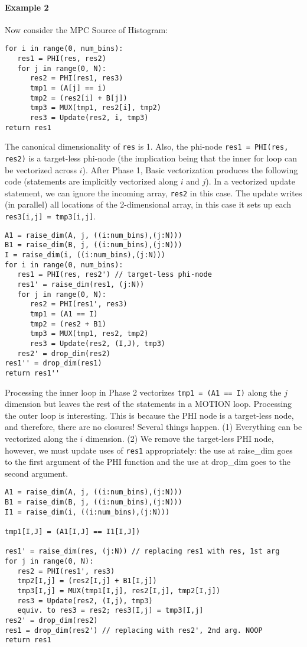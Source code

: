 \paragraph{Example 2} Now consider the MPC Source of Histogram:

{\small
\begin{verbatim}
for i in range(0, num_bins):
   res1 = PHI(res, res2)
   for j in range(0, N):
      res2 = PHI(res1, res3)
      tmp1 = (A[j] == i)
      tmp2 = (res2[i] + B[j])
      tmp3 = MUX(tmp1, res2[i], tmp2)
      res3 = Update(res2, i, tmp3)
return res1
\end{verbatim}
}

The canonical dimensionality of \texttt{res} is 1. Also, the phi-node \texttt{res1 = PHI(res, res2)} is a target-less phi-node (the implication being that the inner for loop can be vectorized across $i$). After Phase 1, Basic vectorization produces the following code (statements are implicitly vectorized along $i$ and $j$). In a vectorized update statement, we can ignore the incoming array, \texttt{res2} in this case. The update writes (in parallel) all locations of the 2-dimensional array, in this case it sets up each \texttt{res3[i,j] = tmp3[i,j]}.

{\small
\begin{verbatim}
A1 = raise_dim(A, j, ((i:num_bins),(j:N)))
B1 = raise_dim(B, j, ((i:num_bins),(j:N)))
I = raise_dim(i, ((i:num_bins),(j:N)))
for i in range(0, num_bins):
   res1 = PHI(res, res2') // target-less phi-node
   res1' = raise_dim(res1, (j:N))
   for j in range(0, N):
      res2 = PHI(res1', res3)
      tmp1 = (A1 == I)
      tmp2 = (res2 + B1)
      tmp3 = MUX(tmp1, res2, tmp2)
      res3 = Update(res2, (I,J), tmp3)
   res2' = drop_dim(res2)
res1'' = drop_dim(res1)
return res1''
\end{verbatim}
}

Processing the inner loop in Phase 2 vectorizes \texttt{tmp1 = (A1 == I)} along the $j$ dimension but leaves the rest of the statements in a MOTION loop. Processing the outer loop is interesting. This is because the PHI node is a target-less node, and therefore, there are no closures! Several things happen. (1) Everything can be vectorized along the $i$ dimension. (2) We remove the target-less PHI node, however, we must update uses of \texttt{res1} appropriately: the use at raise\_dim goes to the first argument of the PHI function and the use at drop\_dim goes to the second argument.

{\small
\begin{verbatim}
A1 = raise_dim(A, j, ((i:num_bins),(j:N)))
B1 = raise_dim(B, j, ((i:num_bins),(j:N)))
I1 = raise_dim(i, ((i:num_bins),(j:N)))

tmp1[I,J] = (A1[I,J] == I1[I,J])

res1' = raise_dim(res, (j:N)) // replacing res1 with res, 1st arg
for j in range(0, N):
   res2 = PHI(res1', res3)
   tmp2[I,j] = (res2[I,j] + B1[I,j])
   tmp3[I,j] = MUX(tmp1[I,j], res2[I,j], tmp2[I,j])
   res3 = Update(res2, (I,j), tmp3)
   equiv. to res3 = res2; res3[I,j] = tmp3[I,j]
res2' = drop_dim(res2)
res1 = drop_dim(res2') // replacing with res2', 2nd arg. NOOP
return res1
\end{verbatim}
}

